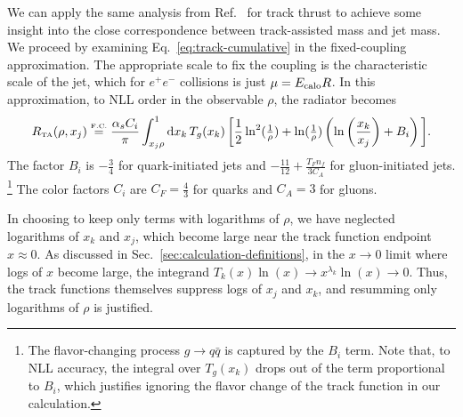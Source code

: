 \documentclass[letterpaper,11pt]{article}
\newcommand{\Ref}[1]{Ref.~\cite{#1}}
\newcommand{\Sec}[1]{Sec.~\ref{#1}}
\newcommand{\Eq}[1]{Eq.~\eqref{#1}}
\begin{document}
We can apply the same analysis from \Ref{Chang:2013iba} for track thrust to achieve some insight into the close correspondence between track-assisted mass and jet mass.
%
We proceed by examining \Eq{eq:track-cumulative} in the fixed-coupling approximation.
%
The appropriate scale to fix the coupling is the characteristic scale of the jet, which for $e^+e^-$ collisions is just $\mu = E_{\rm calo}R$. 
%
In this approximation, to NLL order in the observable $\rho$, the radiator becomes
\begin{equation}
\label{eq:radiator-fixed-coupling}
R_{\mbox{\tiny TA}}(\rho,x_j) \overset{\mbox{\tiny F.C.}}{=} \frac{\alpha_sC_i}{\pi}\int_{x_j\rho}^1 \text{d}x_k\, T_g(x_k)\, \bigg[\frac{1}{2}\ln^2(\tfrac{1}{\rho}) + \ln(\tfrac{1}{\rho})\left(\ln\left(\frac{x_k}{x_j}\right)+B_i\right)\bigg].
\end{equation}
The factor $B_i$ is $-\frac{3}{4}$ for quark-initiated jets and $-\frac{11}{12} + \frac{T_Fn_f}{3C_A}$ for gluon-initiated jets.%
%
\footnote{The flavor-changing process $g \to q \bar{q}$ is captured by the $B_i$ term.  Note that, to NLL accuracy, the integral over $T_g(x_k)$ drops out of the term proportional to $B_i$, which justifies ignoring the flavor change of the track function in our calculation.}
%
The color factors $C_i$ are $C_F = \tfrac{4}{3}$ for quarks and $C_A = 3$ for gluons. 


In choosing to keep only terms with logarithms of $\rho$, we have neglected logarithms of $x_k$ and $x_j$, which become large near the track function endpoint $x\approx 0$. 
%
As discussed in \Sec{sec:calculation-definitions}, in the $x\rightarrow 0$ limit where logs of $x$ become large, the integrand $T_k(x)\ln(x) \rightarrow x^{\lambda_k}\ln(x) \rightarrow 0$. 
%
Thus, the track functions themselves suppress logs of $x_j$ and $x_k$, and resumming only  logarithms of $\rho$ is justified.
\end{document}

